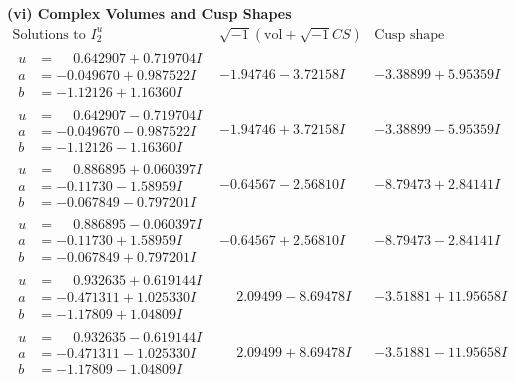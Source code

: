\documentclass[1p]{elsarticle_modified}
\theoremstyle{definition}
\newcommand{\I}{\sqrt{-1}}
\begin{document}
\newpage\flushleft \textbf{(vi) Complex Volumes and Cusp Shapes}
$$\begin{array}{c|c|c}  
\text{Solutions to }I^u_{2}& \I (\text{vol} + \sqrt{-1}CS) & \text{Cusp shape}\\
 \hline 
\begin{aligned}
u &= \phantom{-}0.642907 + 0.719704 I \\
a &= -0.049670 + 0.987522 I \\
b &= -1.12126 + 1.16360 I\end{aligned}
 & -1.94746 - 3.72158 I & -3.38899 + 5.95359 I \\ \hline\begin{aligned}
u &= \phantom{-}0.642907 - 0.719704 I \\
a &= -0.049670 - 0.987522 I \\
b &= -1.12126 - 1.16360 I\end{aligned}
 & -1.94746 + 3.72158 I & -3.38899 - 5.95359 I \\ \hline\begin{aligned}
u &= \phantom{-}0.886895 + 0.060397 I \\
a &= -0.11730 - 1.58959 I \\
b &= -0.067849 - 0.797201 I\end{aligned}
 & -0.64567 - 2.56810 I & -8.79473 + 2.84141 I \\ \hline\begin{aligned}
u &= \phantom{-}0.886895 - 0.060397 I \\
a &= -0.11730 + 1.58959 I \\
b &= -0.067849 + 0.797201 I\end{aligned}
 & -0.64567 + 2.56810 I & -8.79473 - 2.84141 I \\ \hline\begin{aligned}
u &= \phantom{-}0.932635 + 0.619144 I \\
a &= -0.471311 + 1.025330 I \\
b &= -1.17809 + 1.04809 I\end{aligned}
 & \phantom{-}2.09499 - 8.69478 I & -3.51881 + 11.95658 I \\ \hline\begin{aligned}
u &= \phantom{-}0.932635 - 0.619144 I \\
a &= -0.471311 - 1.025330 I \\
b &= -1.17809 - 1.04809 I\end{aligned}
 & \phantom{-}2.09499 + 8.69478 I & -3.51881 - 11.95658 I \\ \hline\begin{aligned}

\end{aligned}
\end{array}$$
\end{document}
